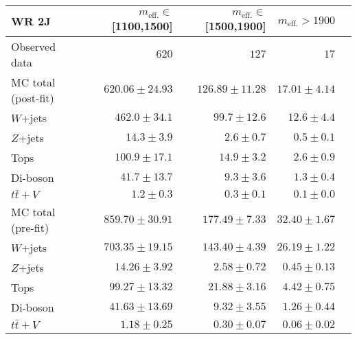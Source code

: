 \begin{table}
  \begin{center}
    \caption{ \label{tab::BGestimation::CRyields_2J}   }

    \begin{tabular*}{\textwidth}{@{\extracolsep{\fill}}lrrrr}
      \toprule
      \textbf{WR 2J} & $m_{\mathrm{eff.}}\in$[1100,1500] & $m_{\mathrm{eff.}}\in$[1500,1900] & $m_{\mathrm{eff.}}>1900$ \\
      \midrule

Observed data          & $620$              & $127$              & $17$                    \\
\midrule
\midrule
MC total (post-fit)         & $620.06 \pm 24.93$          & $126.89 \pm 11.28$          & $17.01 \pm 4.14$              \\
\midrule
        $W$+jets         & $462.0 \pm 34.1$          & $99.7 \pm 12.6$          & $12.6 \pm 4.4$              \\
        $Z$+jets         & $14.3 \pm 3.9$          & $2.6 \pm 0.7$          & $0.5 \pm 0.1$              \\
        Tops         & $100.9 \pm 17.1$          & $14.9 \pm 3.2$          & $2.6 \pm 0.9$              \\
        Di-boson         & $41.7 \pm 13.7$          & $9.3 \pm 3.6$          & $1.3 \pm 0.4$              \\
        $t\bar{t}+V$         & $1.2 \pm 0.3$          & $0.3 \pm 0.1$          & $0.1 \pm 0.0$              \\
\midrule
\midrule
MC total (pre-fit)              & $859.70 \pm 30.91$          & $177.49 \pm 7.33$          & $32.40 \pm 1.67$              \\
\midrule
        $W$+jets         & $703.35 \pm 19.15$          & $143.40 \pm 4.39$          & $26.19 \pm 1.22$              \\
        $Z$+jets         & $14.26 \pm 3.92$          & $2.58 \pm 0.72$          & $0.45 \pm 0.13$              \\
        Tops         & $99.27 \pm 13.32$          & $21.88 \pm 3.16$          & $4.42 \pm 0.75$              \\
        Di-boson         & $41.63 \pm 13.69$          & $9.32 \pm 3.55$          & $1.26 \pm 0.44$              \\
        $t\bar{t}+V$         & $1.18 \pm 0.25$          & $0.30 \pm 0.07$          & $0.06 \pm 0.02$              \\
    \bottomrule
    \end{tabular*}



\end{center}
\end{table}
